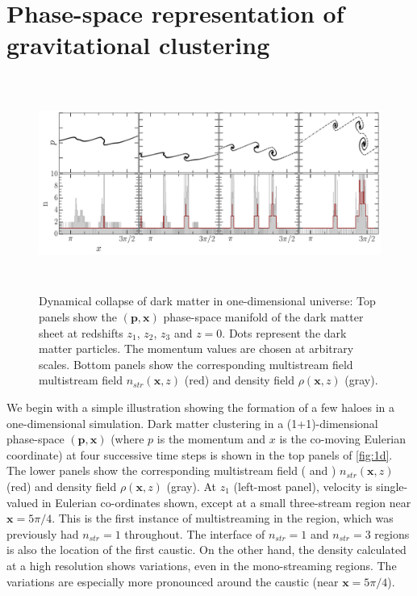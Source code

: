 \section{Phase-space representation of gravitational clustering}
\label{sec:HaloFormation}

\begin{figure} 
\centering\includegraphics[height=7cm]{Chapter5/Source_v2/fig1.pdf} 
\caption{Dynamical collapse of dark matter in one-dimensional universe: Top panels show the $(\mathbf{p}, \mathbf{x})$ phase-space manifold of the dark matter sheet at redshifts $z_1$, $z_2$, $z_3$ and $z = 0$. Dots represent the dark matter particles. The momentum values are chosen at arbitrary scales. Bottom panels show the corresponding multistream field multistream field $n_{str}(\mathbf{x}, z)$ (red) and density field $\rho(\mathbf{x}, z)$ (gray). }
\label{fig:1d}
\end{figure}

We begin with a simple illustration showing the formation of a few haloes in a one-dimensional simulation. Dark matter clustering in a (1+1)-dimensional phase-space $(\mathbf{p}, \mathbf{x})$ (where $p$ is the momentum and $x$ is the co-moving Eulerian coordinate) at four successive time steps is shown in the top panels of \autoref{fig:1d}. The lower panels show the corresponding multistream field (\citealt{Shandarin2012} and \citealt{Abel2012}) $n_{str}(\mathbf{x}, z)$ (red) and density field $\rho(\mathbf{x}, z)$ (gray). At $z_1$ (left-most panel), velocity is single-valued in Eulerian co-ordinates shown, except at a small three-stream region near $\mathbf{x} = 5\pi/4$. This is the first instance of multistreaming in the region, which was previously had $n_{str} = 1$ throughout. The interface of $n_{str} = 1$ and $n_{str} = 3$ regions is also the location of the first caustic. On the other hand, the density calculated at a high resolution shows variations, even in the mono-streaming regions. The variations are especially more pronounced around  the caustic (near $\mathbf{x} = 5\pi/4$).


